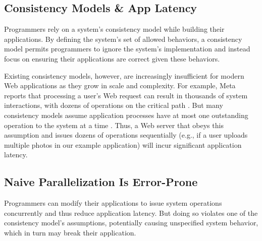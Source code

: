 

\subsection{Consistency Models \& App Latency}

Programmers rely on a system's consistency model while building their applications. By defining the system's set of allowed behaviors, a consistency model permits programmers to ignore the system's implementation and instead focus on ensuring their applications are correct given these behaviors.


Existing consistency models, however, are increasingly insufficient for modern Web applications as they grow in scale and complexity. For example, Meta reports that processing a user's Web request can result in thousands of system interactions, with dozens of operations on the critical path \cite{ajoux2015challenges,dean2013tail}. But many consistency models assume application processes have at most one outstanding operation to the system at a time \cite{ahamad1995causal,herlihy1990linearizability}. Thus, a Web server that obeys this assumption and issues dozens of operations sequentially
(e.g., if a user uploads multiple photos in our example application)
will incur significant application latency.


\subsection{Naive Parallelization Is Error-Prone}

Programmers can modify their applications to issue system operations concurrently
and thus reduce application latency. But doing so violates one of the consistency
model's assumptions, potentially causing unspecified system behavior,
which in turn may break their application.


